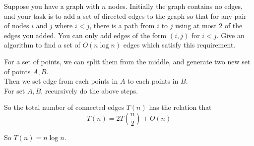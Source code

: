 \problem{}

\solution{}

Suppose you have a graph with $n$ nodes. Initially the graph contains no edges, and your task is to add a set of directed edges to the graph so that for any pair of nodes $i$ and $j$ where $i < j$, there is a path from $i$ to $j$ using at most 2 of the edges you added. You can only add edges of the form $(i,j)$ for $i < j$.  Give an algorithm to find a set of $O(n \log n)$ edges which satisfy this requirement.

For a set of points, we can split them from the middle, and generate two new set of points $A,B$.\\

Then we set edge from each points in $A$ to each points in $B$.\\

For set $A,B$, recursively do the above steps.

So the total number of connected edges $T(n)$ has the relation that 
$$T(n)=2T(\dfrac{n}{2})+O(n)$$

So $T(n)=n\log n$.\\

\newpage